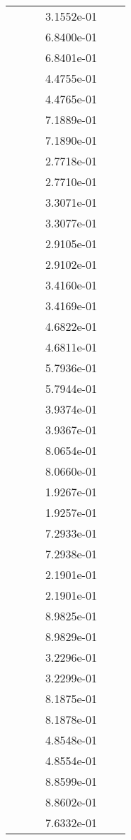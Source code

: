 \begin{xltabular}{\textwidth}{r|rS[table-format=1.3e+2]S[table-format=1.4e+2]S[table-format=1.4e+2]S[table-format=-1.5]}
&  &  & 3.1552e-01 & & \\
&  &  & 6.8400e-01 & & \\
&  &  & 6.8401e-01 & & \\
&  &  & 4.4755e-01 & & \\
&  &  & 4.4765e-01 & & \\
&  &  & 7.1889e-01 & & \\
&  &  & 7.1890e-01 & & \\
&  &  & 2.7718e-01 & & \\
&  &  & 2.7710e-01 & & \\
&  &  & 3.3071e-01 & & \\
&  &  & 3.3077e-01 & & \\
&  &  & 2.9105e-01 & & \\
&  &  & 2.9102e-01 & & \\
&  &  & 3.4160e-01 & & \\
&  &  & 3.4169e-01 & & \\
&  &  & 4.6822e-01 & & \\
&  &  & 4.6811e-01 & & \\
&  &  & 5.7936e-01 & & \\
&  &  & 5.7944e-01 & & \\
&  &  & 3.9374e-01 & & \\
&  &  & 3.9367e-01 & & \\
&  &  & 8.0654e-01 & & \\
&  &  & 8.0660e-01 & & \\
&  &  & 1.9267e-01 & & \\
&  &  & 1.9257e-01 & & \\
&  &  & 7.2933e-01 & & \\
&  &  & 7.2938e-01 & & \\
&  &  & 2.1901e-01 & & \\
&  &  & 2.1901e-01 & & \\
&  &  & 8.9825e-01 & & \\
&  &  & 8.9829e-01 & & \\
&  &  & 3.2296e-01 & & \\
&  &  & 3.2299e-01 & & \\
&  &  & 8.1875e-01 & & \\
&  &  & 8.1878e-01 & & \\
&  &  & 4.8548e-01 & & \\
&  &  & 4.8554e-01 & & \\
&  &  & 8.8599e-01 & & \\
&  &  & 8.8602e-01 & & \\
&  &  & 7.6332e-01 & & \\

\end{xltabular}
